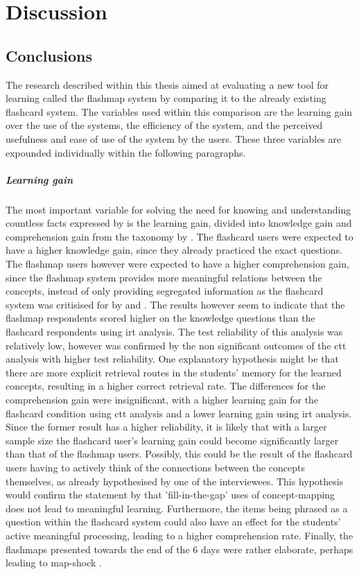 \chapter{Discussion}
\label{ch:discussion}

\section{Conclusions}

The research described within this thesis aimed at evaluating a new tool for learning called the flashmap system by comparing it to the already existing flashcard system. The variables used within this comparison are the learning gain over the use of the systems, the efficiency of the system, and the perceived usefulness and ease of use of the system by the users. These three variables are expounded individually within the following paragraphs.

\paragraph{Learning gain} The most important variable for solving the need for knowing and understanding countless facts expressed by  is the learning gain, divided into knowledge gain and comprehension gain from the taxonomy by . The flashcard users were expected to have a higher knowledge gain, since they already practiced the exact questions. The flashmap users however were expected to have a higher comprehension gain, since the flashmap system provides more meaningful relations between the concepts, instead of only providing segregated information as the flashcard system was critisised for by  and . The results however seem to indicate that the flashmap respondents scored higher on the knowledge questions than the flashcard respondents using irt analysis. The test reliability of this analysis was relatively low, however was confirmed by the non significant outcomes of the ctt analysis with higher test reliability. One explanatory hypothesis might be that there are more explicit retrieval routes in the students' memory for the learned concepts, resulting in a higher correct retrieval rate. The differences for the comprehension gain were insignificant, with a higher learning gain for the flashcard condition using ctt analysis and a lower learning gain using irt analysis. Since the former result has a higher reliability, it is likely that with a larger sample size the flashcard user's learning gain could become significantly larger than that of the flashmap users. Possibly, this could be the result of the flashcard users having to actively think of the connections between the concepts themselves, as already hypothesised by one of the interviewees. This hypothesis would confirm the statement by  that 'fill-in-the-gap' uses of concept-mapping does not lead to meaningful learning. Furthermore, the items being phrased as a question within the flashcard system could also have an effect for the students' active meaningful processing, leading to a higher comprehension rate. Finally, the flashmaps presented towards the end of the 6 days were rather elaborate, perhaps leading to map-shock \cite{moore}.

